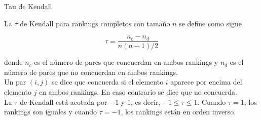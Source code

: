 \documentclass[10pt,hyperref={unicode}]{beamer}
\begin{document}
	\begin{frame}{Tau de Kendall}
		\begin{defi}
			La $\tau$ de Kendall para rankings completos con tamaño $n$ se define como sigue
			
			\begin{equation} \label{def:tau_kendall}
			\tau = \dfrac{n_c - n_d}{n(n-1)/2}
			\end{equation}
			
			donde $n_c$ es el número de pares que concuerdan en ambos rankings y $n_d$ es el número de pares que no concuerdan en ambos rankings.\\
			
			Un par $(i,j)$ se dice que concuerda si el elemento $i$ aparece por encima del elemento $j$ en ambos rankings. En caso contrario se dice que no concuerda.\\
			
			La $\tau$ de Kendall está acotada por $-1$ y $1$, es decir, $-1 \leq \tau \leq 1$. Cuando $\tau = 1$, los rankings son iguales y cuando $\tau = -1$, los rankings están en orden inverso.  
		\end{defi}
	\end{frame}
	
\end{document}
